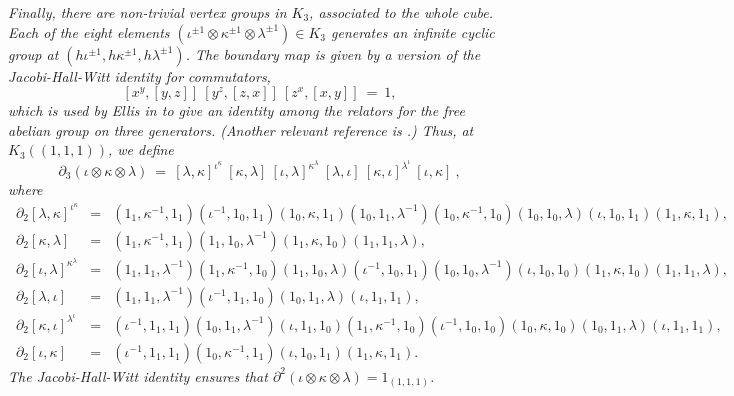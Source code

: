 \begin{example}
\medskip\noindent
\emph{Finally, there are non-trivial vertex groups in $K_3$, 
associated to the whole cube. 
Each of the eight elements 
$(\iota^{\pm 1}\otimes\kappa^{\pm 1}\otimes\lambda^{\pm 1}) \in K_3$ 
generates an infinite cyclic group at 
$(h\iota^{\pm 1},h\kappa^{\pm 1},h\lambda^{\pm 1})$. 
The boundary map is given by a version of the Jacobi-Hall-Witt 
identity for commutators,} 
$$
[x^y,[y,z]]\ [y^z,[z,x]]\ [z^x,[x,y]] ~=~ 1, 
$$
\emph{which is used by Ellis in \cite{ellis-jsc2004} to give an identity 
among the relators for the free abelian group on three generators. 
(Another relevant reference is \cite{brow:higg:1981}.) 
Thus, at $K_3((1,1,1))$, we define} 
$$
\partial_3(\iota\otimes\kappa\otimes\lambda) ~=~ 
[\lambda,\kappa]^{\iota^{\kappa}}\ [\kappa,\lambda]\ 
[\iota,\lambda]^{\kappa^{\lambda}}\ [\lambda,\iota]\ 
[\kappa,\iota]^{\lambda^{\iota}}\ [\iota,\kappa]\ ,
$$
\emph{where} 
\small{
\begin{eqnarray*}
\,\partial_2[\lambda,\kappa]^{\iota^{\kappa}} 
  &=&  (1_1,\kappa^{-1},1_1)(\iota^{-1},1_0,1_1)(1_0,\kappa,1_1) 
         (1_0,1_1,\lambda^{-1})(1_0,\kappa^{-1},1_0) 
           (1_0,1_0,\lambda)(\iota,1_0,1_1)(1_1,\kappa,1_1), \\
\,\partial_2[\kappa,\lambda]~~ 
  &=&  (1_1,\kappa^{-1},1_1)(1_1,1_0,\lambda^{-1}) 
         (1_1,\kappa,1_0)(1_1,1_1,\lambda), \\
\,\partial_2[\iota,\lambda]^{\kappa^{\lambda}} 
  &=&  (1_1,1_1,\lambda^{-1})(1_1,\kappa^{-1},1_0)(1_1,1_0,\lambda) 
         (\iota^{-1},1_0,1_1)(1_0,1_0,\lambda^{-1}) 
           (\iota,1_0,1_0)(1_1,\kappa,1_0)(1_1,1_1,\lambda), \\
\,\partial_2[\lambda,\iota]~~ 
  &=&  (1_1,1_1,\lambda^{-1})(\iota^{-1},1_1,1_0) 
            (1_0,1_1,\lambda)(\iota,1_1,1_1), \\
\,\partial_2[\kappa,\iota]^{\lambda^{\iota}} 
  &=&  (\iota^{-1},1_1,1_1)(1_0,1_1,\lambda^{-1})(\iota,1_1,1_0) 
         (1_1,\kappa^{-1},1_0)(\iota^{-1},1_0,1_0)
           (1_0,\kappa,1_0)(1_0,1_1,\lambda)(\iota,1_1,1_1), \\
\,\partial_2[\iota,\kappa]~~ 
  &=&  (\iota^{-1},1_1,1_1)(1_0,\kappa^{-1},1_1)
            (\iota,1_0,1_1)(1_1,\kappa,1_1). 
\end{eqnarray*}
} 
\emph{The Jacobi-Hall-Witt identity ensures that 
$\partial^2(\iota\otimes\kappa\otimes\lambda) = 1_{(1,1,1)}$.} 
\end{example}

